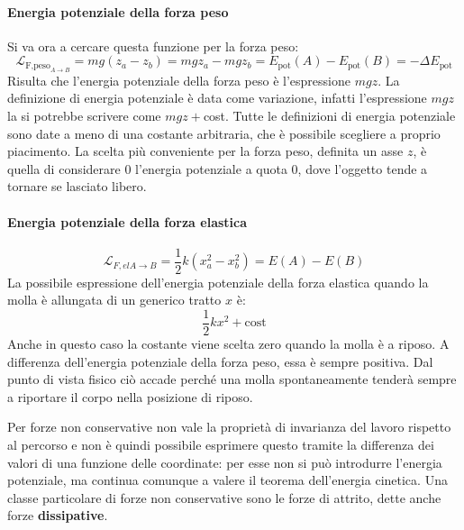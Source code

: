 \documentclass[10pt,a4paper]{book}
\begin{document}
\paragraph{Energia potenziale della forza peso} Si va ora a cercare questa funzione per la forza peso:
\[
	\mathcal{L}_{\text{F,peso}_{A\to B}}=mg(z_a-z_b)=mgz_a-mgz_b=E_{\text{pot}}(A)-E_{ \text{pot} } (B)=-\Delta E_{ \text{pot} }
\]
Risulta che l'energia potenziale della forza peso è l'espressione $mgz$. La definizione di energia potenziale è data come variazione, infatti l'espressione $mgz$ la si potrebbe scrivere come $mgz+$cost. Tutte le definizioni di energia potenziale sono date a meno di una costante arbitraria, che è possibile scegliere a proprio piacimento. La scelta più conveniente per la forza peso, definita un asse $z$, è quella di considerare $0$ l'energia potenziale a quota $0$, dove l'oggetto tende a tornare se lasciato libero.

\paragraph{Energia potenziale della forza elastica}
\[
	\mathcal{L}_{F,el A\to B}=\frac{1}{2}k(x_a^2-x_b^2)=E(A)-E(B)
\]
La possibile espressione dell'energia potenziale della forza elastica quando la molla è allungata di un generico tratto $x$ è:
\[
	\frac{1}{2}kx^2+\text{cost}
\]
Anche in questo caso la costante viene scelta zero quando la molla è a riposo. A differenza dell'energia potenziale della forza peso, essa è sempre positiva. Dal punto di vista fisico ciò accade perché una molla spontaneamente tenderà sempre a riportare il corpo nella posizione di riposo.

Per forze non conservative non vale la proprietà di invarianza del lavoro rispetto al percorso e non è quindi possibile esprimere questo tramite la differenza dei valori di una funzione delle coordinate: per esse non si può introdurre l'energia potenziale, ma continua comunque a valere il teorema dell'energia cinetica. Una classe particolare di forze non conservative sono le forze di attrito, dette anche forze \textbf{dissipative}.
\end{document}

